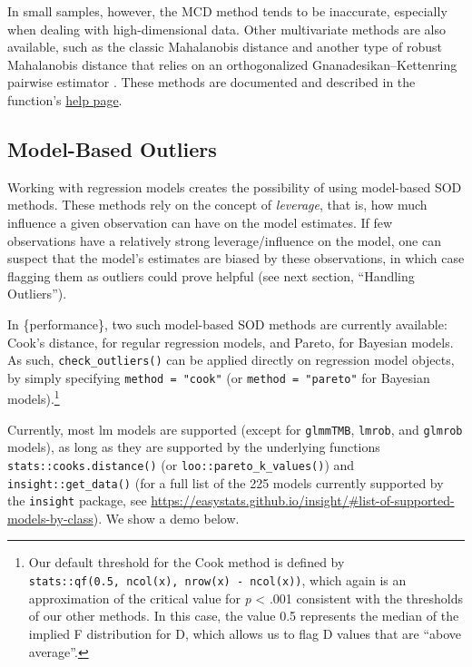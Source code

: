 \documentclass[sn-basic, lineno,pdflatex]{sn-jnl}
\begin{document}
In small samples, however, the MCD method tends to be inaccurate,
especially when dealing with high-dimensional data. Other multivariate
methods are also available, such as the classic Mahalanobis distance and
another type of robust Mahalanobis distance that relies on an
orthogonalized Gnanadesikan--Kettenring pairwise estimator
\citep{gnanadesikan1972robust}. These methods are documented and
described in the function's
\href{https://easystats.github.io/performance/reference/check_outliers.html}{help
page}.

\subsection{Model-Based Outliers}\label{model-based-outliers}

Working with regression models creates the possibility of using
model-based SOD methods. These methods rely on the concept of
\emph{leverage}, that is, how much influence a given observation can
have on the model estimates. If few observations have a relatively
strong leverage/influence on the model, one can suspect that the model's
estimates are biased by these observations, in which case flagging them
as outliers could prove helpful (see next section, ``Handling
Outliers'').

In \{performance\}, two such model-based SOD methods are currently
available: Cook's distance, for regular regression models, and Pareto,
for Bayesian models. As such, \texttt{check\_outliers()} can be applied
directly on regression model objects, by simply specifying
\texttt{method\ =\ "cook"} (or \texttt{method\ =\ "pareto"} for Bayesian
models).\footnote{Our default threshold for the Cook method is defined
  by \texttt{stats::qf(0.5,\ ncol(x),\ nrow(x)\ -\ ncol(x))}, which
  again is an approximation of the critical value for \emph{p}
  \textless{} .001 consistent with the thresholds of our other methods.
  In this case, the value 0.5 represents the median of the implied F
  distribution for D, which allows us to flag D values that are ``above
  average''.}

Currently, most lm models are supported (except for \texttt{glmmTMB},
\texttt{lmrob}, and \texttt{glmrob} models), as long as they are
supported by the underlying functions \texttt{stats::cooks.distance()}
(or \texttt{loo::pareto\_k\_values()}) and \texttt{insight::get\_data()}
(for a full list of the 225 models currently supported by the
\texttt{insight} package, see
\url{https://easystats.github.io/insight/\#list-of-supported-models-by-class}).
We show a demo below.
\end{document}
